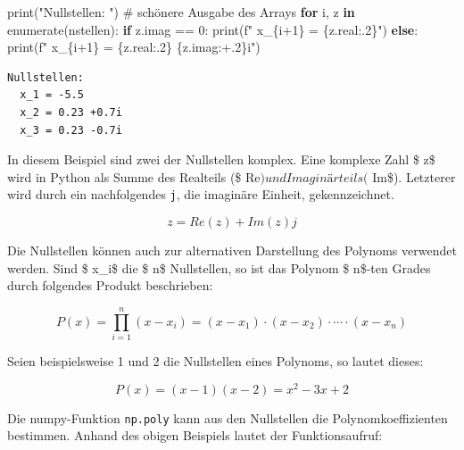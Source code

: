 \documentclass[
  letterpaper,
  DIV=11,
  numbers=noendperiod]{scrreprt}
\newenvironment{Shaded}{\begin{snugshade}}{\end{snugshade}}
\newcommand{\BuiltInTok}[1]{\textcolor[rgb]{0.00,0.23,0.31}{#1}}
\newcommand{\CommentTok}[1]{\textcolor[rgb]{0.37,0.37,0.37}{#1}}
\newcommand{\ControlFlowTok}[1]{\textcolor[rgb]{0.00,0.23,0.31}{\textbf{#1}}}
\newcommand{\DecValTok}[1]{\textcolor[rgb]{0.68,0.00,0.00}{#1}}
\newcommand{\KeywordTok}[1]{\textcolor[rgb]{0.00,0.23,0.31}{\textbf{#1}}}
\newcommand{\NormalTok}[1]{\textcolor[rgb]{0.00,0.23,0.31}{#1}}
\newcommand{\OperatorTok}[1]{\textcolor[rgb]{0.37,0.37,0.37}{#1}}
\newcommand{\SpecialCharTok}[1]{\textcolor[rgb]{0.37,0.37,0.37}{#1}}
\newcommand{\SpecialStringTok}[1]{\textcolor[rgb]{0.13,0.47,0.30}{#1}}
\newcommand{\StringTok}[1]{\textcolor[rgb]{0.13,0.47,0.30}{#1}}
\begin{document}
\begin{Shaded}
\begin{Highlighting}[]
\BuiltInTok{print}\NormalTok{(}\StringTok{"Nullstellen: "}\NormalTok{)}
\CommentTok{\# schönere Ausgabe des Arrays}
\ControlFlowTok{for}\NormalTok{ i, z }\KeywordTok{in} \BuiltInTok{enumerate}\NormalTok{(nstellen):}
    \ControlFlowTok{if}\NormalTok{ z.imag }\OperatorTok{==} \DecValTok{0}\NormalTok{:}
        \BuiltInTok{print}\NormalTok{(}\SpecialStringTok{f"  x\_}\SpecialCharTok{\{}\NormalTok{i}\OperatorTok{+}\DecValTok{1}\SpecialCharTok{\}}\SpecialStringTok{ = }\SpecialCharTok{\{}\NormalTok{z}\SpecialCharTok{.}\NormalTok{real}\SpecialCharTok{:.2\}}\SpecialStringTok{"}\NormalTok{)}
    \ControlFlowTok{else}\NormalTok{:}
        \BuiltInTok{print}\NormalTok{(}\SpecialStringTok{f"  x\_}\SpecialCharTok{\{}\NormalTok{i}\OperatorTok{+}\DecValTok{1}\SpecialCharTok{\}}\SpecialStringTok{ = }\SpecialCharTok{\{}\NormalTok{z}\SpecialCharTok{.}\NormalTok{real}\SpecialCharTok{:.2\}}\SpecialStringTok{ }\SpecialCharTok{\{}\NormalTok{z}\SpecialCharTok{.}\NormalTok{imag}\SpecialCharTok{:+.2\}}\SpecialStringTok{i"}\NormalTok{)}
\end{Highlighting}
\end{Shaded}

\begin{verbatim}
Nullstellen: 
  x_1 = -5.5
  x_2 = 0.23 +0.7i
  x_3 = 0.23 -0.7i
\end{verbatim}

In diesem Beispiel sind zwei der Nullstellen komplex. Eine komplexe Zahl
\$ z\$ wird in Python als Summe des Realteils (\$
Re\() und Imaginärteils (\) Im\$). Letzterer wird durch ein
nachfolgendes \texttt{j}, die imaginäre Einheit, gekennzeichnet.

\[ z = Re(z) + Im(z)j\]

Die Nullstellen können auch zur alternativen Darstellung des Polynoms
verwendet werden. Sind \$ x\_i\$ die \$ n\$ Nullstellen, so ist das
Polynom \$ n\$-ten Grades durch folgendes Produkt beschrieben:

\[ P(x) = \prod_{i=1}^n \left(x - x_i\right) = (x - x_1)\cdot (x - x_2) \cdot \cdots \cdot (x - x_n) \]

Seien beispielsweise 1 und 2 die Nullstellen eines Polynoms, so lautet
dieses:

\[  P(x) = (x - 1)(x - 2) = x^2 - 3x +2 \]

Die numpy-Funktion \texttt{np.poly} kann aus den Nullstellen die
Polynomkoeffizienten bestimmen. Anhand des obigen Beispiels lautet der
Funktionsaufruf:
\end{document}
